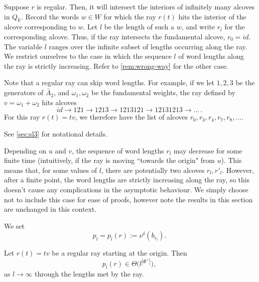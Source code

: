 \documentclass[a4paper,11pt]{amsart}
\renewcommand{\dots}{\text{...}}
\newcommand{\R}{\mathbb{R}}
\newcommand{\ra}{\rightarrow}
\numberwithin{equation}{subsection}
\theoremstyle{definition}
\theoremstyle{remark}
\begin{document}
Suppose $r$ is regular. Then, it will intersect the interiors of infinitely many alcoves in $Q_\R$. Record the words $w \in W$ for which the ray $r(t)$ hits the interior of the alcove corresponding to $w$. Let $l$ be the length of such a $w$, and write $r_l$ for the corresponding alcove. Thus, if the ray intersects the fundamental alcove, \(r_0=id\). The variable \(l\) ranges over the infinite subset of lengths occurring
along the ray. We restrict ourselves to the case in which the sequence $l$ of word lengths along the ray is strictly increasing. Refer to \autoref{rem:wrong-way} for the other case.

\begin{Remark}
Note that a regular ray can skip word lengths. For example, if we let \(1,2,3\) be the
generators of \(\widetilde{A_2}\), and \(\omega_1,\omega_2\) be the fundamental
weights, the ray defined by \(v=\omega_1+\omega_2\) hits alcoves
\[
id \ra 121 \ra 1213 \ra 1213121 \ra 12131213 \ra \dots\,.
\]
For this ray $r(t) = tv$, we therefore have the list of alcoves $r_0, r_3, r_4, r_7, r_8, \dots$.

See \autoref{sec:sl3} for notational details.
\end{Remark}

\begin{Remark}\label{rem:wrong-way}
Depending on $u$ and $v$, the sequence of word lengths $r_l$ may decrease for some finite time (intuitively, if the ray is moving ``towards the origin" from $u$). This means that, for some values of $l$, there are potentially two alcoves $r_l, r'_l$. However, after a finite point, the word lengths are strictly increasing along the ray, so this doesn't cause any complications in the asymptotic behaviour. We simply choose not to include this case for ease of proofs, however note the results in this section are unchanged in this context.
\end{Remark}

We set
\[
p_l=p_l(r):=\nu^\delta(b_{r_l}).
\]

\begin{Theorem}\label{thm:poly-projective-ray}
Let \(r(t)=tv\) be a regular ray starting at the origin. Then
\[
p_l(r)\in \Theta\bigl(l^{|\Phi^+|}\bigr),
\]
as \(l\to\infty\) through the lengths met by the ray.
\end{Theorem}
\end{document}
